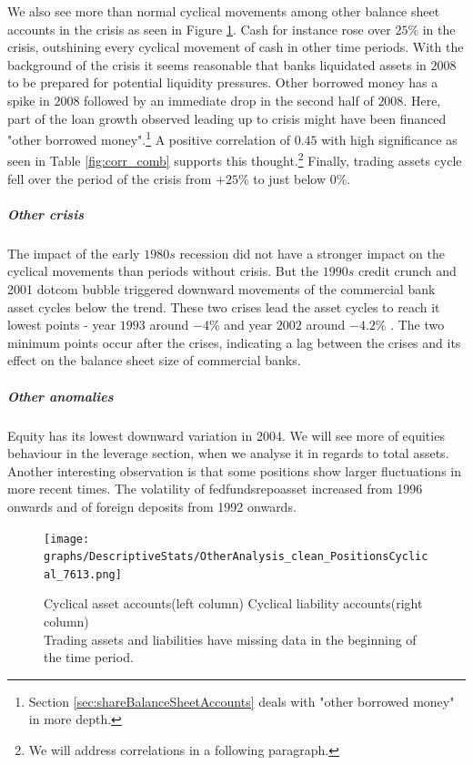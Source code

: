 \documentclass[12pt, a4paper]{article} %
\begin{document}
We also see more than normal cyclical movements among other balance sheet accounts in the crisis as seen in Figure \ref{fig:positions}. Cash for instance rose over $25\%$ in the crisis, outshining every cyclical movement of cash in other time periods. With the background of the crisis it seems reasonable that banks liquidated assets in $2008$ to be prepared for potential liquidity pressures. 
Other borrowed money has a spike in $2008$ followed by an immediate drop in the second half of $2008$. Here, part of the loan growth observed leading up to crisis might have been financed "other borrowed money".\footnote{Section \ref{sec:shareBalanceSheetAccounts} deals with "other borrowed money" in more depth.} A positive correlation of $0.45$ with high significance as seen in Table \ref{fig:corr_comb} supports this thought.\footnote{We will address correlations in a following paragraph.} 
Finally, trading assets cycle fell over the period of the crisis from $+25\%$ to just below $0\%$.



\subparagraph{Other crisis}
The impact of the early $1980s$ recession did not have a stronger impact on the cyclical movements than periods without crisis. But the $1990s$ credit crunch and 2001 dotcom bubble triggered downward movements of the commercial bank asset cycles below the trend. These two crises lead the asset cycles to reach it lowest points - year $1993$ around $-4\%$ and year $2002$ around $-4.2\%$ . The two minimum points occur after the crises, indicating a lag between the crises and its effect on the balance sheet size of commercial banks.

\subparagraph{Other anomalies}
Equity has its lowest downward variation in 2004. We will see more of equities behaviour in the leverage section, when we analyse it in regards to total assets.
Another interesting observation is that some positions show larger fluctuations in more recent times. The volatility of fedfundsrepoasset increased from 1996 onwards and of foreign deposits from 1992 onwards.

\begin{figure}[H]
\begin{minipage}{\textwidth}
\texttt{[image: graphs/DescriptiveStats/OtherAnalysis\_clean\_PositionsCyclical\_7613.png]}
\caption[1]{Cyclical asset accounts(left column) \hspace{2cm} Cyclical liability accounts(right column)\\
 Trading assets and liabilities have missing data in the beginning of the time period.}
\label{fig:positions}
\end{minipage}
\end{figure}
\end{document}
